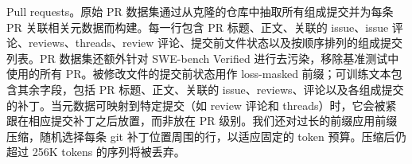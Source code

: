 Pull requests。原始 PR 数据集通过从克隆的仓库中抽取所有组成提交并为每条 PR 关联相关元数据而构建。每一行包含 PR 标题、正文、关联的 issue、issue 评论、reviews、threads、review 评论、提交前文件状态以及按顺序排列的组成提交列表。PR 数据集还额外针对 SWE-bench Verified 进行去污染，移除基准测试中使用的所有 PR。被修改文件的提交前状态用作 loss-masked 前缀；可训练文本包含其余字段，包括 PR 标题、正文、关联的 issue、reviews、评论以及各组成提交的补丁。当元数据可映射到特定提交（如 review 评论和 threads）时，它会被紧跟在相应提交补丁之后放置，而非放在 PR 级别。我们还对过长的前缀应用前缀压缩，随机选择每条 git 补丁位置周围的行，以适应固定的 token 预算。压缩后仍超过 256K tokens 的序列将被丢弃。
